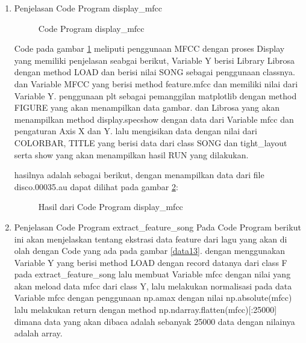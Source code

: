 \begin{enumerate}
\item Penjelasan Code Program display\_mfcc

\begin{figure}[!htbp]
      \caption{Code Program display\_mfcc}
      \label{data11}
\end{figure}

\subitem Code pada gambar \ref{data11} meliputi penggunaan MFCC dengan proses Display yang memiliki penjelasan seabgai berikut, Variable Y berisi Library Librosa dengan method LOAD dan berisi nilai SONG sebagai penggunaan classnya. dan Variable MFCC yang berisi method feature.mfcc dan memiliki nilai dari Variable Y. penggunaan plt sebagai pemanggilan matplotlib dengan method FIGURE yang akan menampilkan data gambar. dan Librosa yang akan menampilkan method display.specshow dengan data dari Variable mfcc dan pengaturan Axis X dan Y. lalu mengisikan data dengan nilai dari COLORBAR, TITLE yang berisi data dari class SONG dan tight\_layout serta show yang akan menampilkan hasil RUN yang dilakukan.

\subitem hasilnya adalah sebagai berikut, dengan menampilkan data dari file disco.00035.au dapat dilihat pada gambar \ref{data12}:

\begin{figure}[!htbp]
      \caption{Hasil dari Code Program display\_mfcc}
      \label{data12}
\end{figure}

\item Penjelasan Code Program extract\_feature\_song
\subitem Pada Code Program berikut ini akan menjelaskan tentang ekstrasi data feature dari lagu yang akan di olah dengan Code yang ada pada gambar \ref{data13}. dengan menggunakan Variable Y yang berisi method LOAD dengan record datanya dari class F pada extract\_feature\_song lalu membuat Variable mfcc dengan nilai yang akan meload data mfcc dari class Y, lalu melakukan normalisasi pada data Variable mfcc dengan penggunaan np.amax dengan nilai np.absolute(mfcc) lalu melakukan return dengan method np.ndarray.flatten(mfcc)[:25000] dimana data yang akan dibaca adalah sebanyak 25000 data dengan nilainya adalah array.


\end{enumerate}
